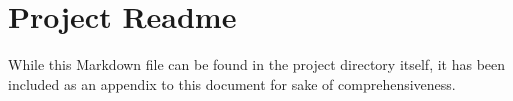\chapter{Project Readme}
\label{Project Readme}

While this Markdown file can be found in the project directory itself, it has been included as an appendix to this document for sake of comprehensiveness.

